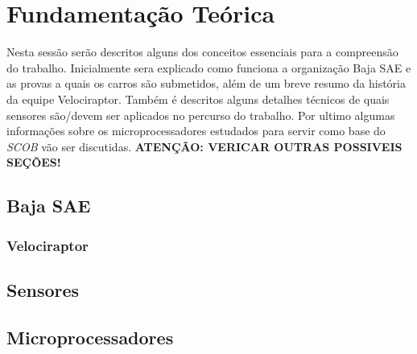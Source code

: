\chapter{Fundamentação Teórica}
	\label{ch:fundamentacao}
Nesta sessão serão descritos alguns dos conceitos essenciais para a compreensão do trabalho. Inicialmente sera explicado como funciona a organização Baja SAE e as provas a quais os carros são submetidos, além de um breve resumo da história da equipe Velociraptor. Também é descritos alguns detalhes técnicos de quais sensores são/devem ser aplicados no percurso do trabalho. Por ultimo algumas informações sobre os microprocessadores estudados para servir como base do \textit{SCOB} vão ser discutidas. \textbf{ATENÇÃO: VERICAR OUTRAS POSSIVEIS SEÇÕES!}

\section{Baja SAE}

\subsection{Velociraptor}

\section{Sensores}

\section{Microprocessadores}




